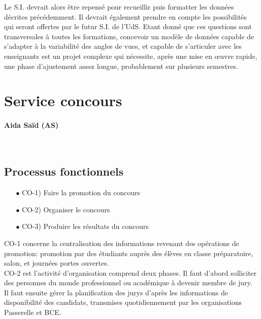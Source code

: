 \documentclass{book}
\begin{document}
Le S.I. devrait alors être repensé pour recueillir puis formatter les 
données décrites précédemment. Il devrait également prendre en compte 
les possibilités qui seront offertes par le futur S.I.  
de l'UdS. Etant donné que ces questions sont transversales à toutes les 
formations, concevoir un modèle de données capable de s'adapter à la 
variabilité des angles de vues, et capable de s'articuler avec les 
enseignants est un projet complexe qui nécessite, après une mise en 
{\oe}uvre rapide, une phase d'ajustement assez longue, probablement sur
plusieurs semestres. 





\section{Service concours }
\paragraph{Aida Saïd (AS)}
~\\

\subsection{Processus fonctionnels}
\label{sc:concours-process}

\begin{itemize}
\item[$\bullet$] CO-1) Faire la promotion du concours
\item[$\bullet$] CO-2) Organiser le concours
\item[$\bullet$] CO-3) Produire les résultats du concours
\end{itemize}
\bigskip

CO-1 concerne la centralisation des informations revenant des
opérations de promotion: promotion par des étudiants auprès  des 
élèves en classe préparatoire, salon, et journées portes 
ouvertes.\\ 

CO-2 est l'activité d'organisation comprend deux phases. Il 
faut d'abord solliciter des personnes du monde professionnel 
ou académique à devenir membre de jury. Il faut ensuite gérer
la planification des jurys d'après les informations de
disponibilité des candidats, transmises quotidiennement
par les organisations Passerelle et BCE.\\
\end{document}
